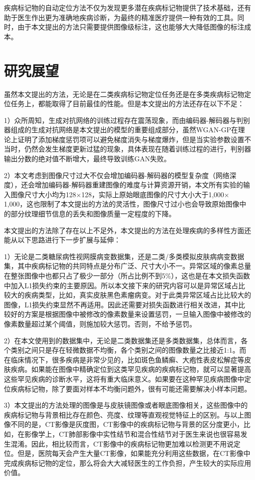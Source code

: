 疾病标记物的自动定位方法不仅为发现更多潜在疾病标记物提供了技术基础，还有助于医生作出更为准确地疾病诊断，为最终的精准医疗提供一种有效的工具。同时，由于本文提出的方法只需要提供图像级标注，这也能够大大降低图像的标注成本。

\section{研究展望}
虽然本文提出的方法，无论是在二类疾病标记物定位任务还是在多类疾病标记物定位任务上，都能取得了目前最佳的性能。但是本文提出的方法还存在以下不足：

1）众所周知，生成对抗网络的训练过程存在震荡现象，而由编码器-解码器与判别器组成的生成对抗网络是本文提出的模型的重要组成部分，虽然WGAN-GP在理论上证明了添加梯度惩罚项可以避免梯度消失与梯度爆炸，但是当实验参数设置不当时，仍然会发生梯度更新过猛的现象，具体表现在随着训练过程的进行，判别器输出分数的绝对值不断增大，最终导致训练GAN失败。

2）本文考虑到图像尺寸过大不仅会增加编码器-解码器的模型复杂度（网络深度），还会增加编码器-解码器重建图像的难度与计算资源开销，本文所有实验的输入图像尺寸大小均为128$\times$128，实际上原始眼底图像的尺寸大小大于1,000$\times$1,000，这也限制了本文提出的方法的灵活性，图像尺寸过小也会导致原始图像中的部分纹理细节信息的丢失和图像质量一定程度的下降。

本文提出的方法除了存在以上不足外，本文提出的方法在处理疾病的多样性方面还能从以下思路进行下一步扩展与延伸：

1）无论是二类糖尿病性视网膜病变数据集，还是二类/多类模拟皮肤病病变数据集，其中疾病标记物的共同特点是分布广泛、尺寸大小不一。异常区域的像素总量在整张图像中也都只占了极少一部分（所占比例不到5\%），这也是在本文损失函数中加入L1损失约束的主要原因。所以本文接下来的研究内容可以是异常区域占比较大的疾病类型，比如，真实皮肤黑色素瘤病变。对于此类异常区域占比比较大的图像，L1损失约束显然不再适用。因此还需要对损失函数进行相关改进，其中比较好的方案是根据图像中被修改的像素数量来设置惩罚，一旦输入图像中被修改的像素数量超过某个阈值，则施加较大惩罚。否则，不给予惩罚。

2）在本文使用到的数据集中，无论是二类数据集还是多类数据集，总体而言，各个类别之间只是存在轻微数据不均衡，各个类别之间的图像数量之比接近1:1。而在临床情况下，很多疾病是非常少见的，比如斑色鱼鳞癣、大疱性表皮松解症等皮肤疾病。如果能在图像中精确定位到这类罕见疾病的疾病标记物，就可以显著提高这些罕见疾病的诊断水平，这将有重大临床意义。如果要在这种罕见疾病图像中定位疾病标记物，除了要面对样本不均衡问题外，很有可能还需要解决小样本问题。

3）本文提出的方法处理的图像是与皮肤镜图像或者眼底图像相关，这些图像中的疾病标记物与背景相比存在颜色、亮度、纹理等直观视觉特征上的区别。与以上图像不同的是，CT影像是灰度图，CT影像中的疾病标记物与背景的区分度更小，比如，在影像学上，CT肺部影像中实性结节和混合性结节对于医生来说也很容易发生混淆。因此，相比较而言，CT影像中的疾病标记物更加难以检测更不用说定位。但是，医院每天会产生大量CT影像，如果能充分利用这些数据，在CT影像中完成疾病标记物的定位，那么将会大大减轻医生的工作负担，产生较大的实际应用价值。
